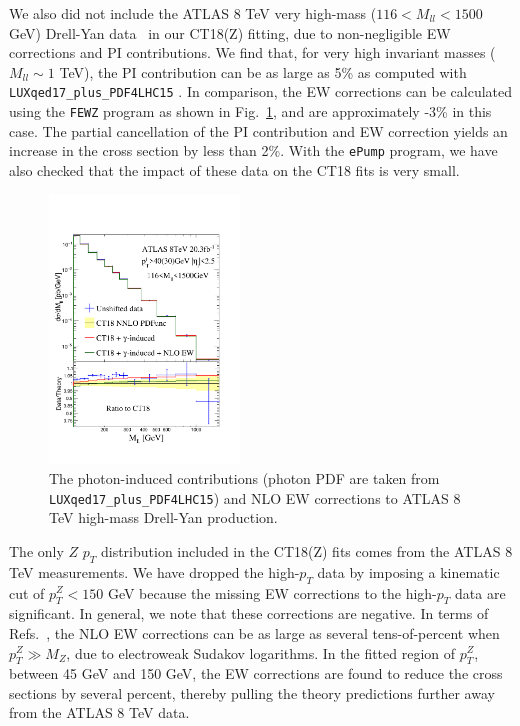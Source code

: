 We also did not include the ATLAS 8 TeV very high-mass ($116\!<\!M_{ll}\!<\!1500$ GeV) Drell-Yan data~\cite{ATLAS8DY} in our CT18(Z) fitting, due to non-negligible 
EW corrections and PI contributions. We find that, for very high invariant masses ($M_{ll}\!\sim\!1$ TeV), the PI contribution can be as large as 5\% as computed 
with \texttt{LUXqed17\_plus\_PDF4LHC15} \cite{Manohar:2017eqh}. 
%
%
In comparison, the EW corrections can be calculated using the \texttt{FEWZ}
program as shown in Fig.~\ref{fig:EW4ATL8DY}, and are approximately -3\% in
this case. The partial cancellation of the PI contribution and EW correction
yields an increase in the cross section by less than 2\%. With the \texttt{ePump} 
program, we have also checked that the impact of these data on the CT18 fits 
is very small.

 \begin{figure}
 \includegraphics[width=0.45\textwidth]{./fig/fig2/ATL8DYhiM_QCDEW.pdf}
\caption{The photon-induced contributions (photon PDF are taken from \texttt{LUXqed17\_plus\_PDF4LHC15}) and NLO EW corrections to ATLAS 8 TeV high-mass Drell-Yan production.}
\label{fig:EW4ATL8DY}
 \end{figure}

The only $Z$ $p_{T}$ distribution included in the CT18(Z) fits 
comes from the ATLAS 8 TeV measurements. We have dropped the high-$p_{T}$ 
data by imposing a kinematic cut of $p_{T}^{Z}\!<\!150$ GeV because the missing 
EW corrections to the high-$p_{T}$ data are significant. 
In general, we note that these corrections are negative. In terms of 
Refs.~\cite{Hollik:2015pja,Kallweit:2015fta}, the NLO EW corrections 
can be as large as several tens-of-percent when 
$p_{T}^{Z}\gg M_{Z}$, due to electroweak Sudakov logarithms. 
In the fitted region of $p_{T}^{Z}$, between 45 GeV and 150 GeV, 
the EW corrections are found to reduce the cross sections by several 
percent, thereby pulling the theory predictions further away from the ATLAS 8 TeV data.  

